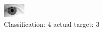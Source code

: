 \begin{figure}[h!]
\begin{center}
\includegraphics[width=0.60\columnwidth]{figures/ID2069_class_4_target_3.png}
\end{center}
\caption{ Classification: 4 actual target: 3}
\label{fig:ID2069_class_4_target_3}
\end{figure}
